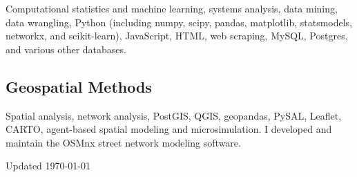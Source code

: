 \documentclass[12pt,letterpaper]{report}
\newcommand{\listitemspace}{0.15em}
\renewenvironment{itemize}
{\begin{list}{}{\setlength{\leftmargin}{0em}
			\setlength{\parskip}{0em}
			\setlength{\itemsep}{\listitemspace}
			\setlength{\parsep}{\listitemspace}}}
	{\end{list}}
\begin{document}
	\begin{itemize}

		\item Computational statistics and machine learning, systems analysis, data mining, data wrangling, Python (including numpy, scipy, pandas, matplotlib, statsmodels, networkx, and scikit-learn), JavaScript, HTML, web scraping, MySQL, Postgres, and various other databases.

	\end{itemize}

	\subsection*{Geospatial Methods}

	\begin{itemize}

		\item Spatial analysis, network analysis, PostGIS, QGIS, geopandas, PySAL, Leaflet, CARTO, agent-based spatial modeling and microsimulation. I developed and maintain the OSMnx street network modeling software.

	\end{itemize}



	\begin{center}
		\vfill
		Updated \monthyeardate\today
	\end{center}
\end{document}
